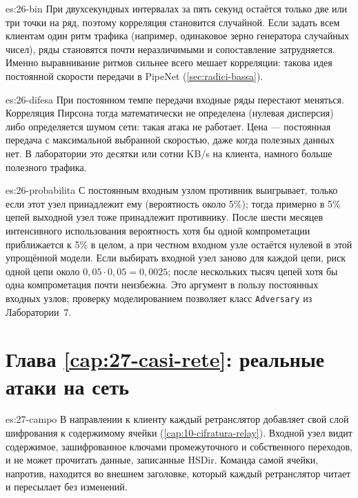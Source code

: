 \begin{soluzione}{es:26-bin}
При двухсекундных интервалах за пять секунд остаётся только две или три точки на ряд, поэтому корреляция становится случайной. Если задать всем клиентам один ритм трафика (например, одинаковое зерно генератора случайных чисел), ряды становятся почти неразличимыми и сопоставление затрудняется. Именно выравнивание ритмов сильнее всего мешает корреляции: такова идея постоянной скорости передачи в PipeNet (\cref{sec:radici-bassa}).
\end{soluzione}

\begin{soluzione}{es:26-difesa}
При постоянном темпе передачи входные ряды перестают меняться. Корреляция Пирсона тогда математически не определена (нулевая дисперсия) либо определяется шумом сети: такая атака не работает. Цена — постоянная передача с максимальной выбранной скоростью, даже когда полезных данных нет. В лаборатории это десятки или сотни KB/s на клиента, намного больше полезного трафика.
\end{soluzione}

\begin{soluzione}{es:26-probabilita}
С постоянным входным узлом противник выигрывает, только если этот узел принадлежит ему (вероятность около 5\%); тогда примерно в 5\% цепей выходной узел тоже принадлежит противнику. После шести месяцев интенсивного использования вероятность хотя бы одной компрометации приближается к 5\% в целом, а при честном входном узле остаётся нулевой в этой упрощённой модели. Если выбирать входной узел заново для каждой цепи, риск одной цепи около $0{,}05 \cdot 0{,}05 = 0{,}0025$; после нескольких тысяч цепей хотя бы одна компрометация почти неизбежна. Это аргумент в пользу постоянных входных узлов; проверку моделированием позволяет класс \texttt{Adversary} из Лаборатории~7.
\end{soluzione}

\section*{Глава \ref{cap:27-casi-rete}: реальные атаки на сеть}

\begin{soluzione}{es:27-campo}
В направлении к клиенту каждый ретранслятор добавляет свой слой шифрования к содержимому ячейки (\cref{cap:10-cifratura-relay}). Входной узел видит содержимое, зашифрованное ключами промежуточного и собственного переходов, и не может прочитать данные, записанные HSDir. Команда самой ячейки, напротив, находится во внешнем заголовке, который каждый ретранслятор читает и пересылает без изменений.
\end{soluzione}


